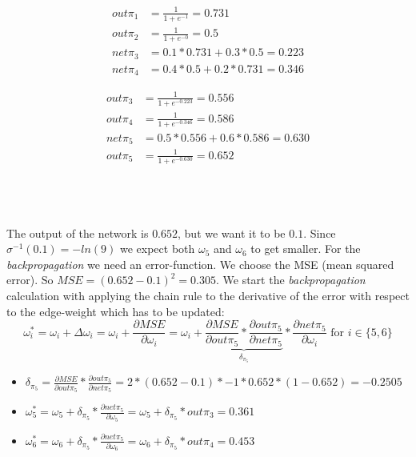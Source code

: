 \noindent\begin{minipage}{.5\linewidth}
	\begin{align*} 
		out\pi_1 &= \frac{1}{1+e^{-1}} = 0.731 \\ 
		out\pi_2 &= \frac{1}{1+e^{-0}} = 0.5 \\
		net\pi_3 &= 0.1*0.731+0.3*0.5 = 0.223 \\
		net\pi_4 &= 0.4*0.5+0.2*0.731 = 0.346
	\end{align*}
\end{minipage}%
\begin{minipage}{.5\linewidth}
	\begin{align*} 
		out\pi_3 &= \frac{1}{1+e^{-0.223}} = 0.556 \\ 
		out\pi_4 &= \frac{1}{1+e^{-0.346}} = 0.586 \\
		net\pi_5 &= 0.5*0.556+0.6*0.586 = 0.630 \\
		out\pi_5 &= \frac{1}{1+e^{-0.630}} = 0.652
	\end{align*}
\end{minipage}\\
\\
\\
The output of the network is $0.652$, but we want it to be $0.1$. Since $\sigma^{-1}(0.1)=-ln(9)$ we expect both $\omega_5$ and $\omega_6$ to get smaller. For the \textit{backpropagation} we need an error-function. We choose the MSE (mean squared error). So $MSE=(0.652-0.1)^2 = 0.305$. We start the \textit{backpropagation} calculation with applying the chain rule to the derivative of the error with respect to the edge-weight which has to be updated:
\begin{equation*}
	\omega_i^* = \omega_i+\Delta \omega_i=\omega_i+\frac{\partial MSE}{\partial \omega_i}=\omega_i+\underbrace{\frac{\partial MSE}{\partial out\pi_5}*\frac{\partial out\pi_5}{\partial net\pi_5}}_{\delta_{\pi_5}}*\frac{\partial net\pi_5}{\partial \omega_i} \text{ for }i \in \{5,6\}
\end{equation*}
\begin{itemize}
	\item $\delta_{\pi_5}=\frac{\partial MSE}{\partial out\pi_5}*\frac{\partial out\pi_5}{\partial net\pi_5}=2*(0.652-0.1)*-1*0.652*(1-0.652)=-0.2505$
	\item $\omega_5^*=\omega_5+\delta_{\pi_5}*\frac{\partial net\pi_5}{\partial \omega_5}=\omega_5+\delta_{\pi_5}*out\pi_3=0.361$
	\item $\omega_6^*=\omega_6+\delta_{\pi_5}*\frac{\partial net\pi_5}{\partial \omega_6}=\omega_6+\delta_{\pi_5}*out\pi_4=0.453$
\end{itemize}
